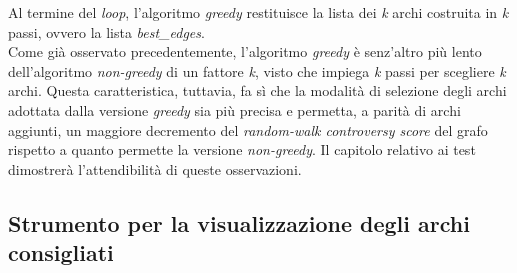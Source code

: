 Al termine del \textit{loop}, l'algoritmo \textit{greedy} restituisce la lista dei \textit{k} archi costruita in \textit{k} passi, ovvero la lista \textit{best\_edges}.
\\Come già osservato precedentemente, l'algoritmo \textit{greedy} è senz'altro più lento dell'algoritmo \textit{non-greedy} di un fattore \textit{k}, visto che impiega \textit{k} passi per scegliere \textit{k} archi. Questa caratteristica, tuttavia, fa sì che la modalità di selezione degli archi adottata dalla versione \textit{greedy} sia più precisa e permetta, a parità di archi aggiunti, un maggiore decremento del \textit{random-walk controversy score} del grafo rispetto a quanto permette la versione \textit{non-greedy}. Il capitolo relativo ai test dimostrerà l'attendibilità di queste osservazioni.

\subsection{Strumento per la visualizzazione degli archi consigliati}





